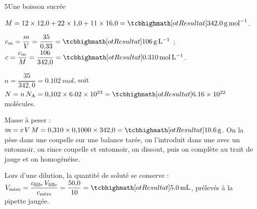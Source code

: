 \begin{corrigeBac}{5}{Une boisson sucrée}
\begin{questions}
\item $M=12\times12{,}0+22\times1{,}0+11\times16{,}0=\res{\qty{342,0}{g.mol^{-1}}}$. 
\item $c_m=\dfrac{m}{V}=\dfrac{35}{0{,}33}=\res{\qty{106}{g.L^{-1}}}$ ; $c=\dfrac{c_m}{M}=\dfrac{106}{342{,}0}=\res{\qty{0,310}{mol.L^{-1}}}$. 
\item $n=\dfrac{35}{342{,}0}=\qty{0,102}{mol}$, soit $N=n\,N_\mathrm{A}=0{,}102\times\num{6,02e23}=\res{\num{6,16e22}}$ molécules. \pts{1 pt}
\item Masse à peser : $m=c\,V\,M=0{,}310\times0{,}1000\times342{,}0=\res{\qty{10,6}{g}}$. On la pèse dans une coupelle sur une balance tarée, on
l'introduit dans une  avec un entonnoir, on rince coupelle et entonnoir, on dissout, puis on
complète au trait de jauge et on homogénéise. \pts{1 pt}
\item Lors d'une dilution, la quantité de soluté se conserve : $V_\text{mère}=\dfrac{c_\text{fille}\,V_\text{fille}}{c_\text{mère}}=\dfrac{50{,}0}{10}=\res{\qty{5,0}{mL}}$, prélevés
à la pipette jaugée. \pts{1 pt}
\end{questions}
\end{corrigeBac}
